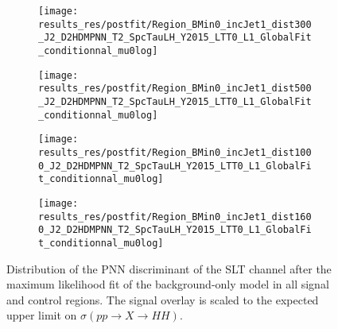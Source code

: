 \begin{figure}[htbp]
  \centering

  \begin{subfigure}{0.495\textwidth}
    \centering

    \texttt{[image: results\_res/postfit/Region\_BMin0\_incJet1\_dist300\_J2\_D2HDMPNN\_T2\_SpcTauLH\_Y2015\_LTT0\_L1\_GlobalFit\_conditionnal\_mu0log]}
  \end{subfigure}\hfill%
  \begin{subfigure}{0.495\textwidth}
    \centering

    \texttt{[image: results\_res/postfit/Region\_BMin0\_incJet1\_dist500\_J2\_D2HDMPNN\_T2\_SpcTauLH\_Y2015\_LTT0\_L1\_GlobalFit\_conditionnal\_mu0log]}
  \end{subfigure}

  \begin{subfigure}{0.495\textwidth}
    \centering

    \texttt{[image: results\_res/postfit/Region\_BMin0\_incJet1\_dist1000\_J2\_D2HDMPNN\_T2\_SpcTauLH\_Y2015\_LTT0\_L1\_GlobalFit\_conditionnal\_mu0log]}
  \end{subfigure}\hfill%
  \begin{subfigure}{0.495\textwidth}
    \centering

    \texttt{[image: results\_res/postfit/Region\_BMin0\_incJet1\_dist1600\_J2\_D2HDMPNN\_T2\_SpcTauLH\_Y2015\_LTT0\_L1\_GlobalFit\_conditionnal\_mu0log]}
  \end{subfigure}

  \caption{Distribution of the PNN discriminant of the \lephad SLT
    channel after the maximum likelihood fit of the background-only
    model in all signal and control regions. The signal overlay is
    scaled to the expected upper limit on $\sigma(pp \to X \to HH)$.}
\end{figure}


